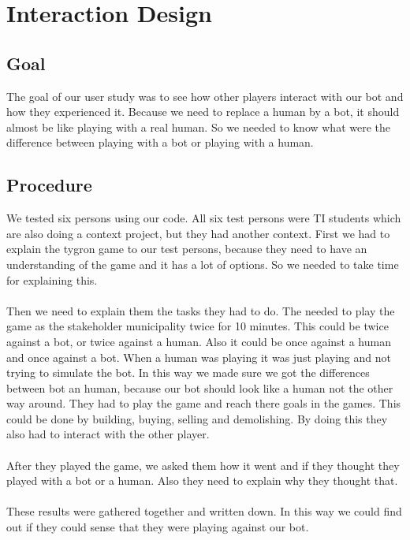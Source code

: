 \section{Interaction Design}

\subsection{Goal}
The goal of our user study was to see how other players interact with our bot and how they experienced it. Because we need to replace a human by a bot, it should almost be like playing with a real human. So we needed to know what were the difference between playing with a bot or playing with a human.

\subsection{Procedure}
We tested six persons using our code.  All six test persons were TI students which are also doing a context project, but they had another context.  
First we had to explain the tygron game to our test persons, because they need to have an understanding of the game and it has a lot of options. So we needed to take time for explaining this. 
\\ \\
Then we need to explain them the tasks they had to do. The needed to play the game as the stakeholder municipality twice for 10 minutes. This could be twice against a bot, or twice against a human. Also it could be once against a human and once against a bot. When a human was playing it was just playing and not trying to simulate the bot. In this way we made sure we got the differences between bot an human, because our bot should look like a human not the other way around. They had to play the game and reach there goals in the games. This could be done by building, buying, selling and demolishing. By doing this they also had to interact with the other player. 
\\ \\
After they played the game, we asked them how it went and if they thought they played with a bot or a human. Also they need to explain why they thought that. 
\\ \\
These results were gathered together and written down. In this way we could find out if they could sense that they were playing against our bot.
